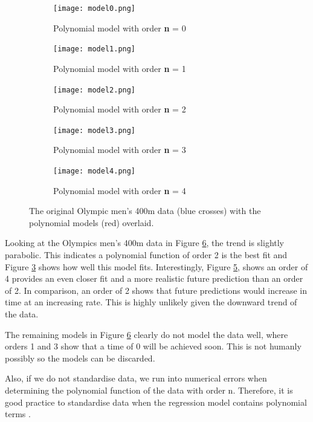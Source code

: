 {\begin{figure}[h!] 
	\centering
	\begin{subfigure}[b]{0.4\textwidth}
		\texttt{[image: model0.png]}
		\caption{Polynomial model with order \textbf{n} = 0}
		\label{fig:model0}
	\end{subfigure}
	\begin{subfigure}[b]{0.4\textwidth}
		\texttt{[image: model1.png]}
		\caption{Polynomial model with order \textbf{n} = 1}
		\label{fig:model1}
	\end{subfigure}
	\begin{subfigure}[b]{0.4\textwidth}
		\texttt{[image: model2.png]}
		\caption{Polynomial model with order \textbf{n} = 2}
		\label{fig:model2}
	\end{subfigure}
	\begin{subfigure}[b]{0.4\textwidth}
		\texttt{[image: model3.png]}
		\caption{Polynomial model with order \textbf{n} = 3}
		\label{fig:model3}
	\end{subfigure}
	\begin{subfigure}[b]{0.4\textwidth}
		\texttt{[image: model4.png]}
		\caption{Polynomial model with order \textbf{n} = 4}
		\label{fig:model4}
	\end{subfigure}
	\caption{The original Olympic men's 400m data (blue crosses) with the polynomial models (red) overlaid.}
	\label{men400-1}
\end{figure}

Looking at the Olympics men's 400m data in Figure \ref{men400-1}, the trend is slightly parabolic. This indicates a polynomial function of order 2 is the best fit and Figure \ref{fig:model2} shows how well this model fits. Interestingly, Figure \ref{fig:model4}, shows an order of 4 provides an even closer fit and a more realistic future prediction than an order of 2. In comparison, an order of 2 shows that future predictions would increase in time at an increasing rate. This is highly unlikely given the downward trend of the data.

The remaining models in Figure \ref{men400-1} clearly do not model the data well, where orders 1 and 3 show that a time of 0 will be achieved soon. This is not humanly possibly so the models can be discarded. 

Also, if we do not standardise data, we run into numerical errors when determining the polynomial function of the data with order n. Therefore, it is good practice to standardise data when the regression model contains polynomial terms \cite{WhenIsIt}.

}
